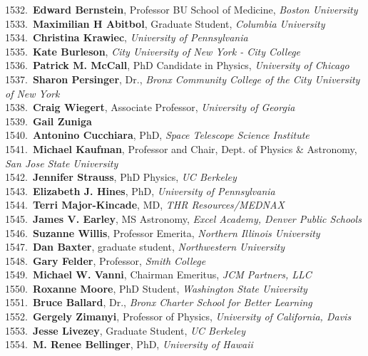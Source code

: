 1532.~{\bf Edward Bernstein}, Professor BU School of Medicine, {\sl Boston  University } \\
1533.~{\bf Maximilian H Abitbol}, Graduate Student, {\sl Columbia University} \\
1534.~{\bf Christina Krawiec}, {\sl University of Pennsylvania} \\
1535.~{\bf Kate Burleson}, {\sl City University of New York - City College} \\
1536.~{\bf Patrick M. McCall}, PhD Candidate in Physics, {\sl University of Chicago} \\
1537.~{\bf Sharon Persinger}, Dr., {\sl Bronx Community College of the City University of New York} \\
1538.~{\bf Craig Wiegert}, Associate Professor, {\sl University of Georgia} \\
1539.~{\bf Gail Zuniga} \\
1540.~{\bf Antonino Cucchiara}, PhD, {\sl Space Telescope Science Institute} \\
1541.~{\bf Michael Kaufman}, Professor and Chair, Dept. of Physics \& Astronomy, {\sl San Jose State University} \\
1542.~{\bf Jennifer Strauss}, PhD Physics, {\sl UC Berkeley} \\
1543.~{\bf Elizabeth J. Hines}, PhD, {\sl University of Pennsylvania} \\
1544.~{\bf Terri Major-Kincade}, MD, {\sl THR Resources/MEDNAX} \\
1545.~{\bf James V. Earley}, MS Astronomy, {\sl Excel Academy, Denver Public Schools} \\
1546.~{\bf Suzanne Willis}, Professor Emerita, {\sl Northern Illinois University} \\
1547.~{\bf Dan Baxter}, graduate student, {\sl Northwestern University} \\
1548.~{\bf Gary Felder}, Professor, {\sl Smith College} \\
1549.~{\bf Michael W. Vanni}, Chairman Emeritus, {\sl JCM Partners, LLC } \\
1550.~{\bf Roxanne Moore}, PhD Student, {\sl Washington State University} \\
1551.~{\bf Bruce Ballard}, Dr., {\sl Bronx Charter School for Better Learning} \\
1552.~{\bf Gergely Zimanyi}, Professor of Physics, {\sl University of California, Davis} \\
1553.~{\bf Jesse Livezey}, Graduate Student, {\sl UC Berkeley } \\
1554.~{\bf M. Renee Bellinger}, PhD, {\sl University of Hawaii} \\
